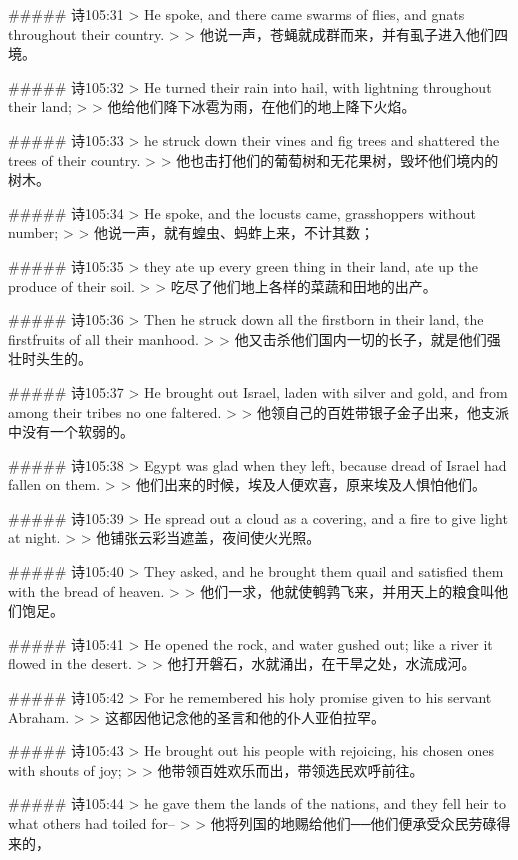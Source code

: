 ##### 诗105:31
> He spoke, and there came swarms of flies, and gnats throughout their country.
>
> 他说一声，苍蝇就成群而来，并有虱子进入他们四境。


##### 诗105:32
> He turned their rain into hail, with lightning throughout their land;
>
> 他给他们降下冰雹为雨，在他们的地上降下火焰。


##### 诗105:33
> he struck down their vines and fig trees and shattered the trees of their country.
>
> 他也击打他们的葡萄树和无花果树，毁坏他们境内的树木。


##### 诗105:34
> He spoke, and the locusts came, grasshoppers without number;
>
> 他说一声，就有蝗虫、蚂蚱上来，不计其数；


##### 诗105:35
> they ate up every green thing in their land, ate up the produce of their soil.
>
> 吃尽了他们地上各样的菜蔬和田地的出产。


##### 诗105:36
> Then he struck down all the firstborn in their land, the firstfruits of all their manhood.
>
> 他又击杀他们国内一切的长子，就是他们强壮时头生的。


##### 诗105:37
> He brought out Israel, laden with silver and gold, and from among their tribes no one faltered.
>
> 他领自己的百姓带银子金子出来，他支派中没有一个软弱的。


##### 诗105:38
> Egypt was glad when they left, because dread of Israel had fallen on them.
>
> 他们出来的时候，埃及人便欢喜，原来埃及人惧怕他们。


##### 诗105:39
> He spread out a cloud as a covering, and a fire to give light at night.
>
> 他铺张云彩当遮盖，夜间使火光照。


##### 诗105:40
> They asked, and he brought them quail and satisfied them with the bread of heaven.
>
> 他们一求，他就使鹌鹑飞来，并用天上的粮食叫他们饱足。


##### 诗105:41
> He opened the rock, and water gushed out; like a river it flowed in the desert.
>
> 他打开磐石，水就涌出，在干旱之处，水流成河。


##### 诗105:42
> For he remembered his holy promise given to his servant Abraham.
>
> 这都因他记念他的圣言和他的仆人亚伯拉罕。


##### 诗105:43
> He brought out his people with rejoicing, his chosen ones with shouts of joy;
>
> 他带领百姓欢乐而出，带领选民欢呼前往。


##### 诗105:44
> he gave them the lands of the nations, and they fell heir to what others had toiled for--
>
> 他将列国的地赐给他们──他们便承受众民劳碌得来的，


